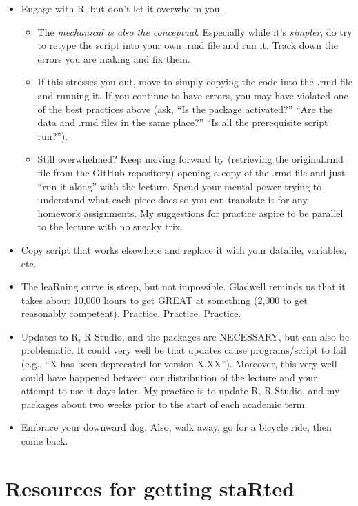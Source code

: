 \documentclass[
  english,
]{book}
\providecommand{\tightlist}{%
  \setlength{\itemsep}{0pt}\setlength{\parskip}{0pt}}
\begin{document}
\begin{itemize}
\tightlist
\item
  Engage with R, but don't let it overwhelm you.

  \begin{itemize}
  \tightlist
  \item
    The \emph{mechanical is also the conceptual}. Especially while it's \emph{simpler}, do try to retype the script into your own .rmd file and run it. Track down the errors you are making and fix them.
  \item
    If this stresses you out, move to simply copying the code into the .rmd file and running it. If you continue to have errors, you may have violated one of the best practices above (ask, ``Is the package activated?'' ``Are the data and .rmd files in the same place?'' ``Is all the prerequisite script run?'').
  \item
    Still overwhelmed? Keep moving forward by (retrieving the original.rmd file from the GitHub repository) opening a copy of the .rmd file and just ``run it along'' with the lecture. Spend your mental power trying to understand what each piece does so you can translate it for any homework assignments. My suggestions for practice aspire to be parallel to the lecture with no sneaky trix.
  \end{itemize}
\item
  Copy script that works elsewhere and replace it with your datafile, variables, etc.\\
\item
  The leaRning curve is steep, but not impossible. Gladwell \citeyearpar{gladwell_outliers_2008} reminds us that it takes about 10,000 hours to get GREAT at something (2,000 to get reasonably competent). Practice. Practice. Practice.
\item
  Updates to R, R Studio, and the packages are NECESSARY, but can also be problematic. It could very well be that updates cause programs/script to fail (e.g., ``X has been deprecated for version X.XX''). Moreover, this very well could have happened between our distribution of the lecture and your attempt to use it days later. My practice is to update R, R Studio, and my packages about two weeks prior to the start of each academic term.
\item
  Embrace your downward dog. Also, walk away, go for a bicycle ride, then come back.
\end{itemize}

\hypertarget{resources-for-getting-started-1}{%
\section{Resources for getting staRted}\label{resources-for-getting-started-1}}
\end{document}
